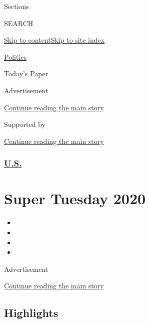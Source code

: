 Sections

SEARCH

\protect\hyperlink{site-content}{Skip to
content}\protect\hyperlink{site-index}{Skip to site index}

\href{https://www.nytimes3xbfgragh.onion/section/politics}{Politics}

\href{https://myaccount.nytimes3xbfgragh.onion/auth/login?response_type=cookie\&client_id=vi}{}

\href{https://www.nytimes3xbfgragh.onion/section/todayspaper}{Today's
Paper}

Advertisement

\protect\hyperlink{after-top}{Continue reading the main story}

Supported by

\protect\hyperlink{after-sponsor}{Continue reading the main story}

\hypertarget{us}{%
\subsubsection{\texorpdfstring{\href{/section/us}{U.S.}}{U.S.}}\label{us}}

\hypertarget{super-tuesday-2020}{%
\section{Super Tuesday 2020}\label{super-tuesday-2020}}

\begin{itemize}
\item
\item
\item
\item
\end{itemize}

Advertisement

\protect\hyperlink{after-subheader}{Continue reading the main story}

\hypertarget{highlights}{%
\subsection{Highlights}\label{highlights}}

